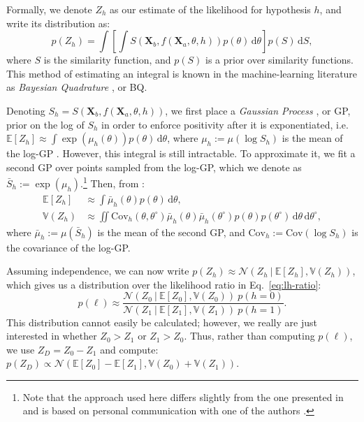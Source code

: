 \documentclass[10pt,letterpaper]{article}
\newcommand{\Xa}[0]{\mathbf{X}_a}
\newcommand{\Xb}[0]{\mathbf{X}_b}
\newcommand{\hi}[0]{h=0}
\newcommand{\hf}[0]{h=1}
\newcommand{\dif}[0]{\,\mathrm{d}}
\begin{document}
Formally, we denote $Z_h$ as our estimate of the likelihood for
hypothesis $h$, and write its distribution as:
\begin{equation}
  p(Z_h) = \int \left[\int S(\Xb, f(\Xa, \theta, h))p(\theta)\dif\theta\right] p(S)\dif S,
\end{equation}
where $S$ is the similarity function, and $p(S)$ is a prior over
similarity functions.  This method of estimating an integral is known
in the machine-learning literature as \textit{Bayesian Quadrature}
\cite{Diaconis:1988uo,OHagan:1991tx,Osborne:2012tm}, or BQ. 

Denoting $S_h=S(\Xb, f(\Xa, \theta, h))$, we first place a
\textit{Gaussian Process} \cite{Rasmussen:2006vz}, or GP, prior on the
log of $S_h$ in order to enforce positivity after it is exponentiated,
i.e. $\mathbb{E}[Z_h] \approx \int
\exp(\mu_h(\theta))p(\theta)\dif\theta$, where $\mu_h:=\mu(\log S_h)$
is the mean of the log-GP \cite{Osborne:2012tm}.  However, this
integral is still intractable. To approximate it, we fit a second GP
over points sampled from the log-GP, which we denote as
$\bar{S}_h:=\exp(\mu_h)$.\footnote{Note that the approach used here
  differs slightly from the one presented in 
  and is based on personal communication with one of the authors
  \cite{Duvenaud:2013td}.} Then, from :
\begin{align}
  \mathbb{E}[Z_h] &\approx \int \bar{\mu}_h(\theta)p(\theta)\dif\theta,\\
  \mathbb{V}(Z_h) &\approx \iint \mathrm{Cov}_h(\theta,
  \theta^\circ)\bar{\mu}_h(\theta)\bar{\mu}_h(\theta^\circ)p(\theta)p(\theta^\circ)\dif\theta\dif\theta^\circ,
\end{align}
where $\bar{\mu}_h:=\mu(\bar{S}_h)$ is the mean of the second GP, and
$\mathrm{Cov}_h:=\mathrm{Cov}(\log S_h)$ is the covariance of the
log-GP.

Assuming independence, we can now write $p(Z_h)\approx\mathcal{N}(Z_h\
\vert\ \mathbb{E}[Z_h], \mathbb{V}(Z_h))$, which gives us a
distribution over the likelihood ratio in Eq.~\ref{eq:lh-ratio}:
\begin{equation}
p(\ell)\approx\frac{\mathcal{N}(Z_0\ \vert\ \mathbb{E}[Z_0], \mathbb{V}(Z_0))\ p(\hi)}{\mathcal{N}(Z_1\ \vert\ \mathbb{E}[Z_1], \mathbb{V}(Z_1))\ p(\hf)}.
\end{equation}
This distribution cannot easily be calculated; however, we really are
just interested in whether $Z_0>Z_1$ or $Z_1>Z_0$. Thus, rather than
computing $p(\ell)$, we use $Z_D=Z_0-Z_1$ and compute:
$p(Z_D)\propto\mathcal{N}(\mathbb{E}[Z_0] - \mathbb{E}[Z_1],
\mathbb{V}(Z_0) + \mathbb{V}(Z_1))$.
\end{document}
